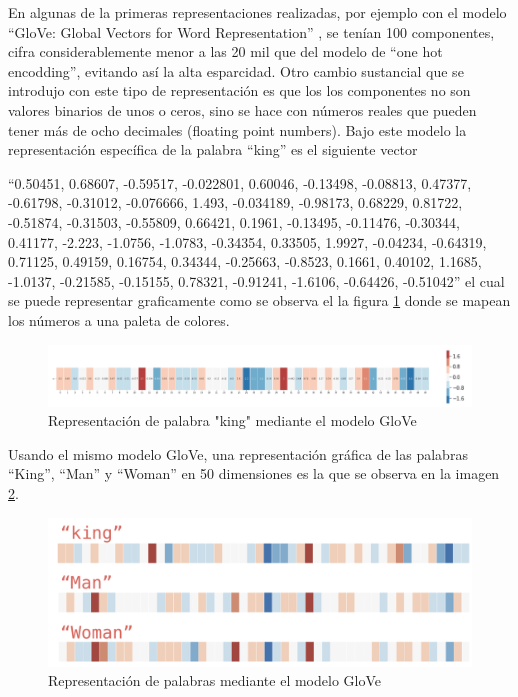 \documentclass[
  10,
  openany]{book}
\begin{document}
En algunas de la primeras representaciones realizadas, por ejemplo con el modelo ``GloVe: Global Vectors for Word Representation'' \citep{pennington2014}, se tenían 100 componentes, cifra considerablemente menor a las 20 mil que del modelo de ``one hot encodding'', evitando así la alta esparcidad. Otro cambio sustancial que se introdujo con este tipo de representación es que los los componentes no son valores binarios de unos o ceros, sino se hace con números reales que pueden tener más de ocho decimales (floating point numbers). Bajo este modelo la representación específica de la palabra ``king'' es el siguiente vector

``0.50451, 0.68607, -0.59517, -0.022801, 0.60046, -0.13498, -0.08813, 0.47377, -0.61798, -0.31012, -0.076666, 1.493, -0.034189, -0.98173, 0.68229, 0.81722, -0.51874, -0.31503, -0.55809, 0.66421, 0.1961, -0.13495, -0.11476, -0.30344, 0.41177, -2.223, -1.0756, -1.0783, -0.34354, 0.33505, 1.9927, -0.04234, -0.64319, 0.71125, 0.49159, 0.16754, 0.34344, -0.25663, -0.8523, 0.1661, 0.40102, 1.1685, -1.0137, -0.21585, -0.15155, 0.78321, -0.91241, -1.6106, -0.64426, -0.51042'' el cual se puede representar graficamente como se observa el la figura \ref{fig:embking} donde se mapean los números a una paleta de colores.

\begin{figure}

{\centering \includegraphics[width=0.95\linewidth]{images/03-marco-teorico/embking} 

}

\caption{Representación de palabra "king" mediante el modelo GloVe}\label{fig:embking}
\end{figure}

Usando el mismo modelo GloVe, una representación gráfica de las palabras ``King'', ``Man'' y ``Woman'' en 50 dimensiones es la que se observa en la imagen \ref{fig:GloVeEmbedd}.

\begin{figure}

{\centering \includegraphics[width=0.95\linewidth]{images/03-marco-teorico/embedding} 

}

\caption{Representación de palabras mediante el modelo GloVe}\label{fig:GloVeEmbedd}
\end{figure}
\end{document}
